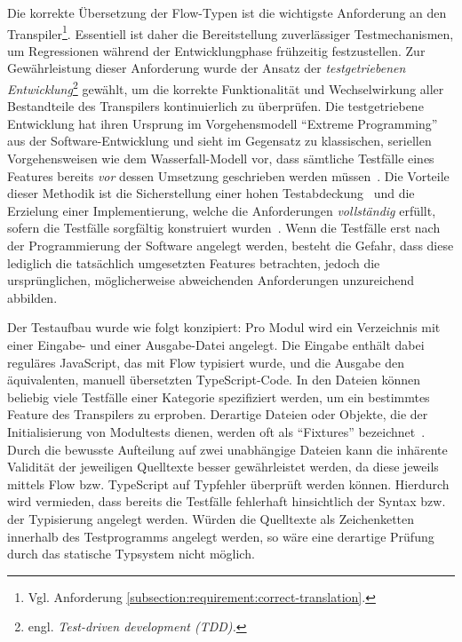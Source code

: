 Die korrekte Übersetzung der Flow-Typen ist die wichtigste Anforderung an den Transpiler\footnote{Vgl. Anforderung \ref{subsection:requirement:correct-translation}.}. Essentiell ist daher die Bereitstellung zuverlässiger Testmechanismen, um Regressionen während der Entwicklungphase frühzeitig festzustellen. Zur Gewährleistung dieser Anforderung wurde der Ansatz der \emph{testgetriebenen Entwicklung}\footnote{engl. \textit{Test-driven development (TDD).}} gewählt, um die korrekte Funktionalität und Wechselwirkung aller Bestandteile des Transpilers kontinuierlich zu überprüfen. Die testgetriebene Entwicklung hat ihren Ursprung im Vorgehensmodell \enquote{Extreme Programming}~\autocite{JEFFRIES:EXTREME_PROGRAMMING} aus der Software-Entwicklung und sieht im Gegensatz zu klassischen, seriellen Vorgehensweisen wie dem Wasserfall-Modell vor, dass sämtliche Testfälle eines Features bereits \emph{vor} dessen Umsetzung geschrieben werden müssen~\autocite{BECK:EXTREME_PROGRAMMING}. Die Vorteile dieser Methodik ist die Sicherstellung einer hohen Testabdeckung~\autocite[90]{BECK:TDD} und die Erzielung einer Implementierung, welche die Anforderungen \emph{vollständig} erfüllt, sofern die Testfälle sorgfältig konstruiert wurden~\autocite[214]{BECK:TDD}. Wenn die Testfälle erst nach der Programmierung der Software angelegt werden, besteht die Gefahr, dass diese lediglich die tatsächlich umgesetzten Features betrachten, jedoch die ursprünglichen, möglicherweise abweichenden Anforderungen unzureichend abbilden.

Der Testaufbau wurde wie folgt konzipiert: Pro Modul wird ein Verzeichnis mit einer Ein\-gabe- und einer Ausgabe-Datei angelegt. Die Eingabe enthält dabei reguläres JavaScript, das mit Flow typisiert wurde, und die Ausgabe den äquivalenten, manuell übersetzten TypeScript-Code. In den Dateien können beliebig viele Testfälle einer Kategorie spezifiziert werden, um ein bestimmtes Feature des Transpilers zu erproben. Derartige Dateien oder Objekte, die der Initialisierung von Modultests dienen, werden oft als \enquote{Fixtures} bezeichnet~\autocite{OLAN:2003}. Durch die bewusste Aufteilung auf zwei unabhängige Dateien kann die inhärente Validität der jeweiligen Quelltexte besser gewährleistet werden, da diese jeweils mittels Flow bzw. TypeScript auf Typfehler überprüft werden können. Hierdurch wird vermieden, dass bereits die Testfälle fehlerhaft hinsichtlich der Syntax bzw. der Typisierung angelegt werden. Würden die Quelltexte als Zeichenketten innerhalb des Testprogramms angelegt werden, so wäre eine derartige Prüfung durch das statische Typsystem nicht möglich.

